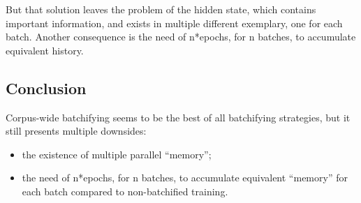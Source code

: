 But that solution leaves the problem of the hidden state, which contains
important information, and exists in multiple different exemplary, one
for each batch. Another consequence is the need of n*epochs, for n
batches, to accumulate equivalent history.

\subsection{Conclusion}

Corpus-wide batchifying seems to be the best of all batchifying
strategies, but it still presents multiple downsides:
\begin{itemize}
\item  the existence of multiple parallel ``memory'';
\item the need of n*epochs, for n batches, to accumulate equivalent ``memory'' for each batch compared to non-batchified training.
\end{itemize}
